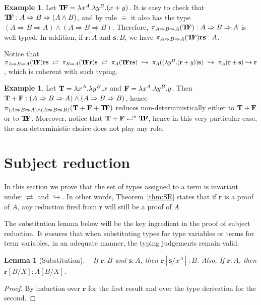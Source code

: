 \documentclass[final,copyright,creativecommons]{eptcs}
\newcommand{\eq}{\ensuremath{\rightleftarrows}}
\newcommand{\re}{\ensuremath{\hookrightarrow}}
\newcommand{\tf}{\mbox{\bf T\!F}}
\newcommand{\true}{\mbox{\bf T}}
\newcommand{\false}{\mbox{\bf F}}
\newcommand{\ve}[1]{\ensuremath{\mathrm{\textbf{#1}}}}
\newtheorem{lemma}[theorem]{Lemma}
\theoremstyle{definition}
\newtheorem{example}[theorem]{Example}
\begin{document}
\begin{example} Let $\tf=\lambda x^A.\lambda y^B.(x+y)$. It is easy to check that $ \tf:A\Rightarrow B\Rightarrow (A\wedge B)$, and by rule $\equiv$ it also has the type $(A\Rightarrow B\Rightarrow A)\wedge (A\Rightarrow B\Rightarrow B)$. Therefore, $\pi_{A\Rightarrow B\Rightarrow A}(\tf):A\Rightarrow B\Rightarrow A$ is well typed. In addition, if $\ve r:A$ and $\ve s:B$, we have $\pi_{A\Rightarrow B\Rightarrow A}(\tf)\ve r\ve s:A$.

Notice that
$\pi_{A\Rightarrow B\Rightarrow A}(\tf)\ve r\ve s~\eq~
\pi_{B\Rightarrow A}(\tf\ve r)\ve s~\eq~
\pi_{A}(\tf\ve r\ve s)~\re~
\pi_A((\lambda y^B.(\ve r+y))\ve s)~\re~
\pi_A(\ve r+\ve s)\re\ve r$,
which is coherent with such typing.
\end{example}

\begin{example}
 Let $\true=\lambda x^A.\lambda y^B.x$ and $\false=\lambda x^A.\lambda y^B.y$. Then $ \true+\false:(A\Rightarrow B\Rightarrow A)\wedge (A\Rightarrow B\Rightarrow B)$, hence $\pi_{(A\Rightarrow B\Rightarrow A)\wedge(A\Rightarrow B\Rightarrow B)}(\true+\false+\tf)$ reduces non-deterministically either to $\true+\false$ or to $\tf$. Moreover, notice that $\true+\false\eq^* \tf$, hence in this very particular case, the non-deterministic choice does not play any role.
\end{example}

\section{Subject reduction}\label{sec:SR}
In this section we prove that the set of types assigned to a term is invariant under $\eq$ and $\re$.
In other words, Theorem~\ref{thm:SR} states that if $\ve r$ is a proof of $A$, any reduction fired from $\ve r$ will still be a proof of $A$.

The substitution lemma below will be the key ingredient in the proof of subject reduction.
It ensures that when substituting types for type variables or terms for term variables,
in an adequate manner, the typing judgements remain valid.

\begin{lemma}[Substitution]\label{lem:substitution}~
 If $\ve r:B$ and $\ve s:A$, then $\ve r[\ve s/x^A]:B$. Also,
 If $\ve r:A$, then $\ve r[B/X]:A[B/X]$.
\end{lemma}
\begin{proof} By induction over $\ve r$ for the first result and over the type derivation for the second.
\end{proof}
\end{document}
